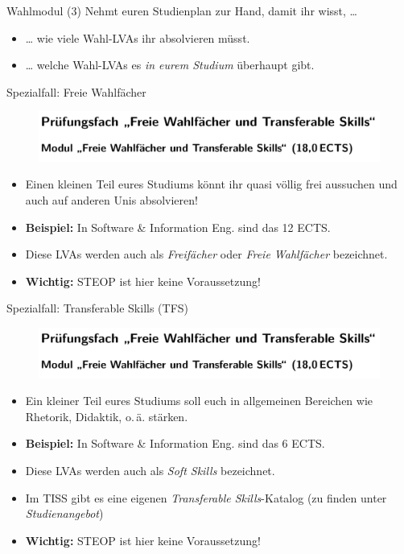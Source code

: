 \documentclass{beamer}
\begin{document}
\begin{frame}{Wahlmodul (3)}
    Nehmt euren Studienplan zur Hand, damit ihr wisst, \ldots
    \begin{itemize}
        \item \ldots{} wie viele Wahl-LVAs ihr absolvieren müsst.
        \item \ldots{} welche Wahl-LVAs es \textit{in eurem Studium} überhaupt
            gibt.
    \end{itemize}
\end{frame}

\begin{frame}{Spezialfall: Freie Wahlfächer}
    \begin{figure}[htp]
        \includegraphics[width=1.0\textwidth]{pruefungsfach3.png}
    \end{figure}
    \begin{itemize}
        \item Einen kleinen Teil eures Studiums könnt ihr quasi völlig frei
              aussuchen und auch auf anderen Unis absolvieren!
        \item \textbf{Beispiel:} In Software \& Information Eng. sind das 12 ECTS.
        \item Diese LVAs werden auch als \textit{Freifächer} oder
              \textit{Freie Wahlfächer} bezeichnet.
        \item \textbf{Wichtig:} STEOP ist hier keine Voraussetzung!
    \end{itemize}
\end{frame}

\begin{frame}{Spezialfall: Transferable Skills (TFS)}
    \begin{figure}[htp]
        \includegraphics[width=1.0\textwidth]{pruefungsfach3.png}
    \end{figure}
    \begin{itemize}
        \item Ein kleiner Teil eures Studiums soll euch in allgemeinen
              Bereichen wie Rhetorik, Didaktik, o.\,ä. stärken.
        \item \textbf{Beispiel:} In Software \& Information Eng. sind das 6 ECTS.
        \item Diese LVAs werden auch als \textit{Soft Skills} bezeichnet.
        \item Im TISS gibt es eine eigenen \textit{Transferable
              Skills}-Katalog (zu finden unter \textit{Studienangebot})
        \item \textbf{Wichtig:} STEOP ist hier keine Voraussetzung!
    \end{itemize}
\end{frame}
\end{document}
